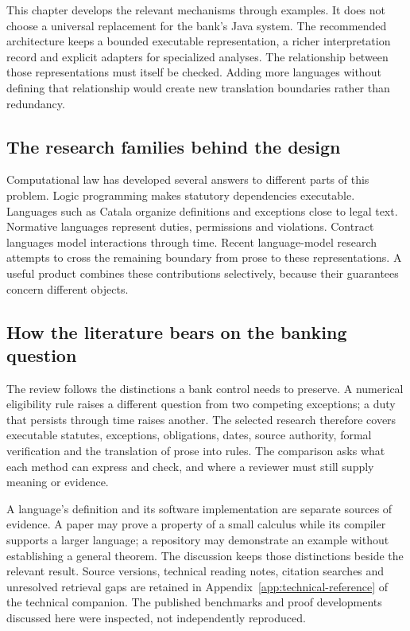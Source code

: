 \documentclass[12pt,a4paper,oneside,openany]{book}
\begin{document}
This chapter develops the relevant mechanisms through examples. It does not
choose a universal replacement for the bank's Java system. The recommended
architecture keeps a bounded executable representation, a richer interpretation
record and explicit adapters for specialized analyses. The relationship between
those representations must itself be checked. Adding more languages without
defining that relationship would create new translation boundaries rather than
redundancy.

\subsection{The research families behind the design}
\label{merge:P-02-literature:00}

\label{sec:literature}

Computational law has developed several answers to different parts of this
problem. Logic programming makes statutory dependencies executable. Languages
such as Catala organize definitions and exceptions close to legal text. Normative
languages represent duties, permissions and violations. Contract languages model
interactions through time. Recent language-model research attempts to cross the
remaining boundary from prose to these representations. A useful product combines
these contributions selectively, because their guarantees concern different
objects.

\subsection{How the literature bears on the banking question}

The review follows the distinctions a bank control needs to preserve. A numerical
eligibility rule raises a different question from two competing exceptions; a
duty that persists through time raises another. The selected research therefore
covers executable statutes, exceptions, obligations, dates, source authority,
formal verification and the translation of prose into rules. The comparison asks
what each method can express and check, and where a reviewer must still supply
meaning or evidence.

A language's definition and its software implementation are separate sources of
evidence. A paper may prove a property of a small calculus while its compiler
supports a larger language; a repository may demonstrate an example without
establishing a general theorem. The discussion keeps those distinctions beside
the relevant result. Source versions, technical reading notes, citation searches
and unresolved retrieval gaps are retained in
Appendix~\ref{app:technical-reference} of the technical companion. The published benchmarks and proof
developments discussed here were inspected, not independently reproduced.
\end{document}
